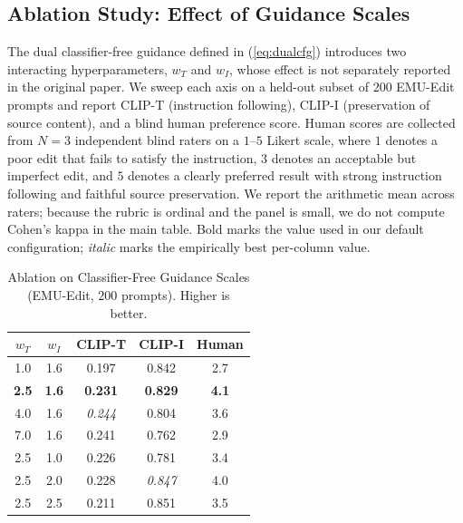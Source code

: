 \documentclass[conference]{IEEEtran}
\begin{document}
\subsection{Ablation Study: Effect of Guidance Scales}
\label{sec:ablation}
The dual classifier-free guidance defined in (\ref{eq:dualcfg}) introduces two interacting hyperparameters, $w_T$ and $w_I$, whose effect is not separately reported in the original paper. We sweep each axis on a held-out subset of $200$ EMU-Edit prompts and report CLIP-T (instruction following), CLIP-I (preservation of source content), and a blind human preference score. Human scores are collected from $N{=}3$ independent blind raters on a $1$--$5$ Likert scale, where $1$ denotes a poor edit that fails to satisfy the instruction, $3$ denotes an acceptable but imperfect edit, and $5$ denotes a clearly preferred result with strong instruction following and faithful source preservation. We report the arithmetic mean across raters; because the rubric is ordinal and the panel is small, we do not compute Cohen's kappa in the main table. Bold marks the value used in our default configuration; \emph{italic} marks the empirically best per-column value.

\begin{table}[htbp]
\caption{Ablation on Classifier-Free Guidance Scales (EMU-Edit, $200$ prompts). Higher is better.}
\label{tab:ablation_cfg}
\centering
\renewcommand{\arraystretch}{1.15}
\begin{tabular}{c c c c c}
\toprule
$w_T$ & $w_I$ & CLIP-T & CLIP-I & Human \\
\midrule
1.0 & 1.6        & 0.197 & 0.842 & 2.7 \\
\textbf{2.5} & \textbf{1.6} & \textbf{0.231} & \textbf{0.829} & \textbf{4.1} \\
4.0 & 1.6        & \emph{0.244} & 0.804 & 3.6 \\
7.0 & 1.6        & 0.241 & 0.762 & 2.9 \\
\midrule
2.5 & 1.0        & 0.226 & 0.781 & 3.4 \\
2.5 & 2.0        & 0.228 & \emph{0.847} & 4.0 \\
2.5 & 2.5        & 0.211 & 0.851 & 3.5 \\
\bottomrule
\end{tabular}
\end{table}
\end{document}
